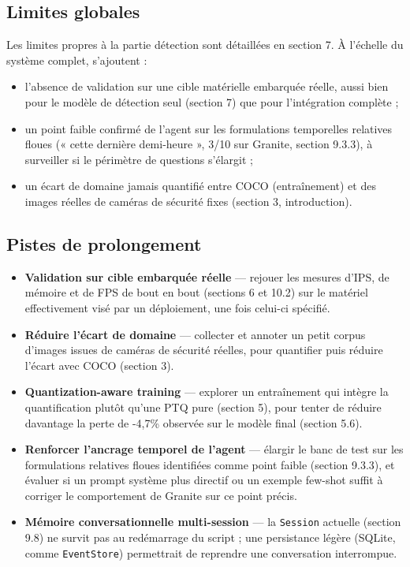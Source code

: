 \documentclass[11pt,a4paper]{article}
\let\Oldsubsection\subsection
\renewcommand{\subsection}{\FloatBarrier\Oldsubsection}
\begin{document}
    \subsection{Limites globales}
    
    Les limites propres à la partie détection sont détaillées en section
    7. À l'échelle du système complet, s'ajoutent :
    
    \begin{itemize}[leftmargin=1.5em]
      \item l'absence de validation sur une cible matérielle embarquée
        réelle, aussi bien pour le modèle de détection seul (section 7) que
        pour l'intégration complète ;
      \item un point faible confirmé de l'agent sur les formulations
        temporelles relatives floues (« cette dernière demi-heure »,
        3/10 sur Granite, section 9.3.3), à surveiller si le périmètre de
        questions s'élargit ;
      \item un écart de domaine jamais quantifié entre COCO
        (entraînement) et des images réelles de caméras de sécurité fixes
        (section 3, introduction).
    \end{itemize}
    
    \subsection{Pistes de prolongement}
    
    \begin{itemize}[leftmargin=1.5em]
      \item \textbf{Validation sur cible embarquée réelle} --- rejouer les
        mesures d'IPS, de mémoire et de FPS de bout en bout (sections 6 et
        10.2) sur le matériel effectivement visé par un déploiement, une
        fois celui-ci spécifié.
      \item \textbf{Réduire l'écart de domaine} --- collecter et annoter un
        petit corpus d'images issues de caméras de sécurité réelles, pour
        quantifier puis réduire l'écart avec COCO
        (section 3).
      \item \textbf{Quantization-aware training} --- explorer un
        entraînement qui intègre la quantification plutôt qu'une PTQ pure
        (section 5), pour tenter de réduire davantage la perte de -4,7\%
        observée sur le modèle final (section 5.6).
      \item \textbf{Renforcer l'ancrage temporel de l'agent} --- élargir le
        banc de test sur les formulations relatives floues identifiées
        comme point faible (section 9.3.3), et évaluer si un prompt système
        plus directif ou un exemple few-shot suffit à corriger le
        comportement de Granite sur ce point précis.
      \item \textbf{Mémoire conversationnelle multi-session} --- la
        \texttt{Session} actuelle (section 9.8) ne survit pas au
        redémarrage du script ; une persistance légère (SQLite, comme
        \texttt{EventStore}) permettrait de reprendre une conversation
        interrompue.
    \end{itemize}
    
    
\end{document}
